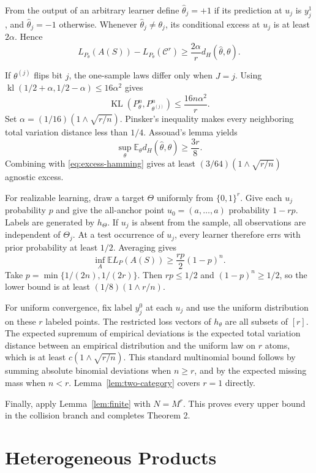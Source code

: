 \documentclass[twoside]{article}
\newcommand{\E}{\mathbb E}
\newcommand{\C}{\mathcal C}
\begin{document}
From the output of an arbitrary learner define $\widehat\theta_j=+1$ if its prediction at $u_j$ is $y_j^1$, and $\widehat\theta_j=-1$ otherwise. Whenever $\widehat\theta_j\neq\theta_j$, its conditional excess at $u_j$ is at least $2\alpha$. Hence
\begin{equation}
 L_{P_\theta}(A(S))-L_{P_\theta}(\C^r)
 \geq\frac{2\alpha}{r}d_H(\widehat\theta,\theta).
 \label{eq:excess-hamming}
\end{equation}

If $\theta^{(j)}$ flips bit $j$, the one-sample laws differ only when $J=j$. Using $\operatorname{kl}(1/2+\alpha,1/2-\alpha)\leq16\alpha^2$ gives
\[
 \operatorname{KL}(P_\theta^n,P_{\theta^{(j)}}^n)\leq\frac{16n\alpha^2}{r}.
\]
Set $\alpha=(1/16)(1\wedge\sqrt{r/n})$. Pinsker's inequality makes every neighboring total variation distance less than $1/4$. Assouad's lemma yields
\[
 \sup_\theta\E_\theta d_H(\widehat\theta,\theta)\geq\frac{3r}{8}.
\]
Combining with \eqref{eq:excess-hamming} gives at least $(3/64)(1\wedge\sqrt{r/n})$ agnostic excess.

For realizable learning, draw a target $\Theta$ uniformly from $\{0,1\}^r$. Give each $u_j$ probability $p$ and give the all-anchor point $u_0=(a,\ldots,a)$ probability $1-rp$. Labels are generated by $h_\Theta$. If $u_j$ is absent from the sample, all observations are independent of $\Theta_j$. At a test occurrence of $u_j$, every learner therefore errs with prior probability at least $1/2$. Averaging gives
\[
 \inf_A\E L_P(A(S))\geq\frac{rp}{2}(1-p)^n.
\]
Take $p=\min\{1/(2n),1/(2r)\}$. Then $rp\leq1/2$ and $(1-p)^n\geq1/2$, so the lower bound is at least $(1/8)(1\wedge r/n)$.

For uniform convergence, fix label $y_j^0$ at each $u_j$ and use the uniform distribution on these $r$ labeled points. The restricted loss vectors of $h_\theta$ are all subsets of $[r]$. The expected supremum of empirical deviations is the expected total variation distance between an empirical distribution and the uniform law on $r$ atoms, which is at least $c(1\wedge\sqrt{r/n})$. This standard multinomial bound follows by summing absolute binomial deviations when $n\geq r$, and by the expected missing mass when $n<r$. Lemma~\ref{lem:two-category} covers $r=1$ directly.

Finally, apply Lemma~\ref{lem:finite} with $N=M^r$. This proves every upper bound in the collision branch and completes Theorem 2.

\section{Heterogeneous Products}
\label{app:heterogeneous}
\end{document}
